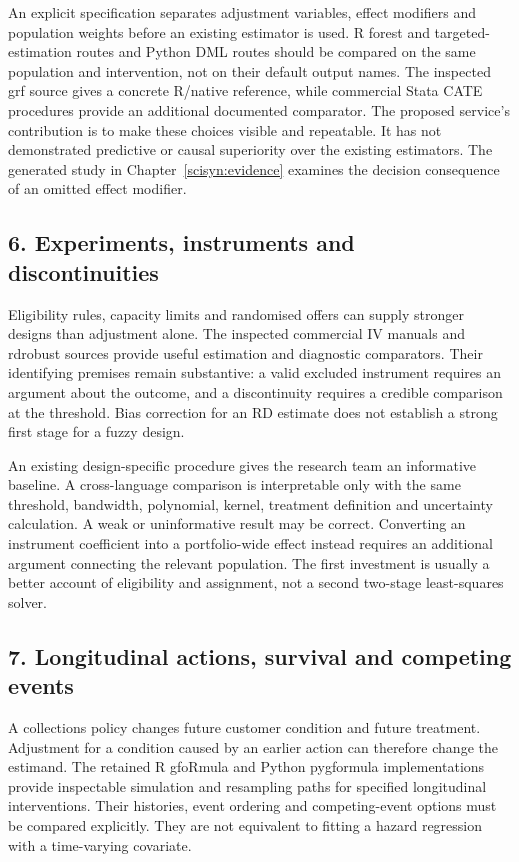 An explicit specification separates adjustment variables, effect modifiers
and population weights before an existing estimator is used.
R forest and targeted-estimation routes and Python DML routes should be compared
on the same population and intervention, not on their default output names.
The inspected grf source gives a concrete R/native reference, while commercial
Stata CATE procedures provide an additional documented comparator.
\citep{exec13_grf_rpath,exec13_ch_stata}
The proposed service's contribution is to make these choices visible and
repeatable. It has not demonstrated predictive or causal superiority over the
existing estimators. The generated study in Chapter~\ref{scisyn:evidence} examines
the decision consequence of an omitted effect modifier.

\subsection{6. Experiments, instruments and discontinuities}
Eligibility rules, capacity limits and randomised offers can supply stronger
designs than adjustment alone. The inspected commercial IV manuals and
rdrobust sources provide useful estimation and diagnostic comparators.
Their identifying premises remain substantive: a valid excluded instrument
requires an argument about the outcome, and a discontinuity requires a
credible comparison at the threshold. Bias correction for an RD estimate does
not establish a strong first stage for a fuzzy design.
\citep{exec13_ivrd_stata,exec13_ivrd_sas,exec13_ivrd_rdrobust}

An existing design-specific procedure gives the research team an informative
baseline. A cross-language comparison is interpretable only with the same
threshold, bandwidth, polynomial, kernel, treatment definition and uncertainty
calculation. A weak or uninformative result may be correct. Converting an
instrument coefficient into a portfolio-wide effect instead requires an
additional argument connecting the relevant population. The first
investment is usually a better account of eligibility and assignment, not a
second two-stage least-squares solver.

\subsection{7. Longitudinal actions, survival and competing events}
A collections policy changes future customer condition and future treatment.
Adjustment for a condition caused by an earlier action can therefore change
the estimand. The retained R gfoRmula and Python pygformula implementations
provide inspectable simulation and resampling paths for specified longitudinal
interventions. Their histories, event ordering and competing-event options
must be compared explicitly. They are not equivalent to fitting a hazard
regression with a time-varying covariate.
\citep{exec20_gformula_reuse,exec24_longpy_pygformula_source,exec14_survival_sas,
exec14_survival_stata_competing}

